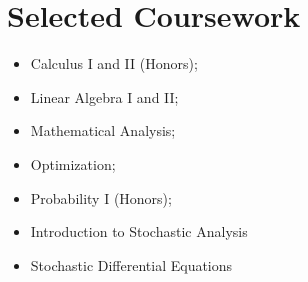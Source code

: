 \documentclass[11pt]{article}
\begin{document}
\section*{Selected Coursework}

\begin{itemize}
    \item Calculus I and II (Honors); 
    \item Linear Algebra I and II; 
    \item Mathematical Analysis; 
    \item Optimization; 
    \item Probability I (Honors); 
    \item Introduction to Stochastic Analysis 
    \item Stochastic Differential Equations 
\end{itemize}
\end{document}
